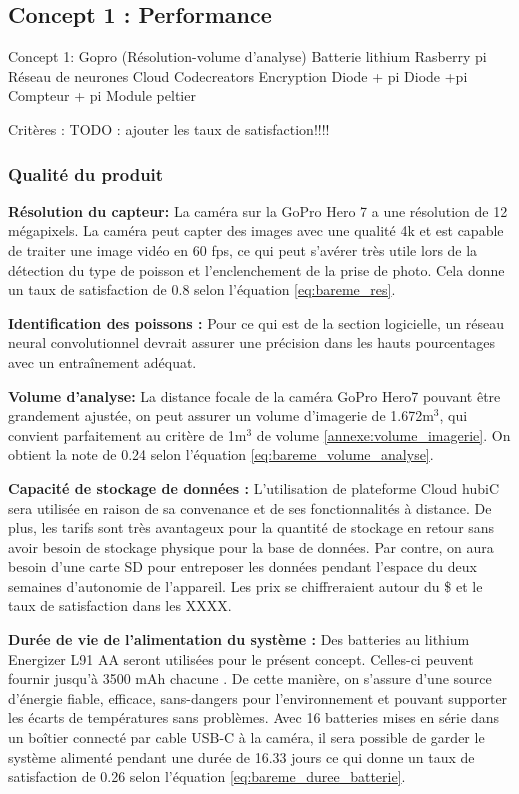 \subsection{Concept 1 : Performance}
Concept 1:
Gopro (Résolution-volume d’analyse)
Batterie lithium
Rasberry pi
Réseau de neurones
Cloud
Codecreators
Encryption
Diode + pi
Diode +pi
Compteur + pi
Module peltier


Critères :
TODO : ajouter les taux de satisfaction!!!!

\subsubsection{Qualité du produit}


\textbf{Résolution du capteur: } La caméra sur la GoPro Hero 7 a une résolution de 12 mégapixels. La caméra peut capter des images avec une qualité 4k et est capable de traiter une image vidéo en 60 fps, ce qui peut s’avérer très utile lors de la détection du type de poisson et l’enclenchement de la prise de photo. Cela donne un taux de satisfaction de 0.8 selon l'équation \ref{eq:bareme_res}.

\textbf{Identification des poissons :}
Pour ce qui est de la section logicielle, un réseau neural convolutionnel devrait assurer une précision dans les hauts pourcentages avec un entraînement adéquat. 

\textbf{Volume d'analyse:} La distance focale de la caméra GoPro Hero7 pouvant être grandement ajustée, on peut assurer un volume d’imagerie de 1.672m$^3$, qui convient parfaitement au critère de 1m$^3$ de volume \ref{annexe:volume_imagerie}.  On obtient la note de 0.24 selon l'équation \ref{eq:bareme_volume_analyse}.


\textbf{Capacité de stockage de données :}
L’utilisation de plateforme Cloud hubiC sera utilisée en raison de sa convenance et de ses fonctionnalités à distance. De plus, les tarifs sont très avantageux pour la quantité de stockage en retour sans avoir besoin de stockage physique pour la base de données. Par contre, on aura besoin d’une carte SD pour entreposer les données pendant l’espace du deux semaines d’autonomie de l’appareil. Les prix se chiffreraient autour du \$ et le taux de satisfaction dans les XXXX. 


\textbf{Durée de vie de l’alimentation du système :}
Des batteries au lithium Energizer L91 AA seront utilisées pour le présent concept. Celles-ci peuvent fournir jusqu'à 3500 mAh chacune \cite{Energizer}. De cette manière, on s’assure d’une source d’énergie fiable, efficace, sans-dangers pour l’environnement et pouvant supporter les écarts de températures sans problèmes. Avec 16 batteries mises en série dans un boîtier connecté par cable USB-C à la caméra, il sera possible de garder le système alimenté pendant une durée de 16.33 jours ce qui donne un taux de satisfaction de 0.26 selon l'équation \ref{eq:bareme_duree_batterie}.


